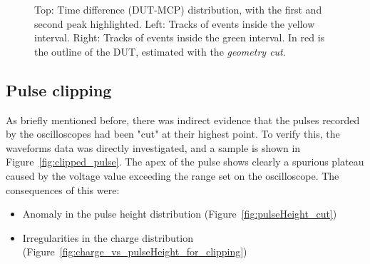 \begin{figure}[h!tbp]
    \hfill
    \captionsetup{width=\captionwidth}
    \caption{Top: Time difference (DUT-MCP) distribution, with the first and second peak highlighted.
    Left: Tracks of events inside the yellow interval. Right: Tracks of events inside the green interval. In red is the outline of the DUT, estimated with the \textit{geometry cut}.}
    \label{fig:time_difference_multiple_peaks_highlight}
\end{figure}

\FloatBarrier

\subsection{Pulse clipping}\label{sec:pulse_clipping}

As briefly mentioned before, there was indirect evidence that the pulses recorded by the oscilloscopes had been "cut" at their highest point. To verify this, the waveforms data was directly investigated, and a sample is shown in Figure~\ref{fig:clipped_pulse}. The apex of the pulse shows clearly a spurious plateau caused by the voltage value exceeding the range set on the oscilloscope. The consequences of this were:

\begin{itemize}
    \item Anomaly in the pulse height distribution (Figure~\ref{fig:pulseHeight_cut})
    \item Irregularities in the charge distribution (Figure~\ref{fig:charge_vs_pulseHeight_for_clipping})
\end{itemize}

